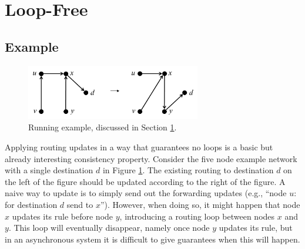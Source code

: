 \section{Loop-Free}
\label{sec:example}

\subsection{Example}

\begin{figure}[t!]
\label{fig:example}
\includegraphics[width=3in]{figures/noloops.png}
\caption{Running example, discussed in Section \ref{sec:example}.}
\end{figure}

Applying routing updates in a way that guarantees no loops is a basic but already interesting consistency property. Consider the five node example network with a single destination $d$ in Figure \ref{fig:example}. The existing routing to destination $d$ on the left of the figure should be updated according to the right of the figure. A naive way to update is to simply send out the forwarding updates (e.g., ``node $u$: for destination $d$ send to $x$''). However, when doing so, it might happen that node $x$ updates its rule before node $y$, introducing a routing loop between nodes $x$ and $y$. This loop will eventually disappear, namely once node $y$ updates its rule, but in an asynchronous system it is difficult to give guarantees when this will happen.

